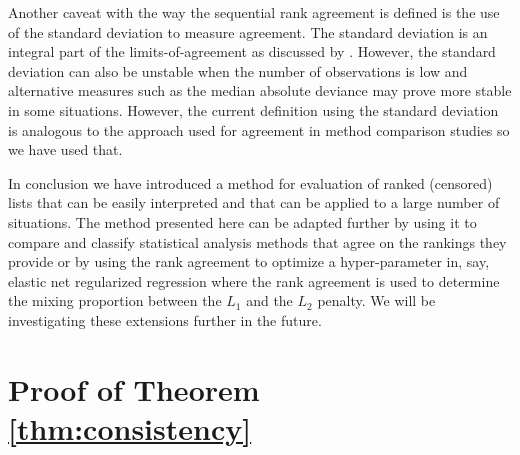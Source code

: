 \documentclass[12pt,a4paper]{article}
\theoremstyle{plain}
\begin{document}
Another caveat with the way the sequential rank agreement is defined
is the use of the standard deviation to measure agreement. The
standard deviation is an integral part of the limits-of-agreement as
discussed by \citet{alt:bland:1983}. However, the standard deviation
can also be unstable when the number of observations is low and
alternative measures such as the median absolute deviance may prove more
stable in some situations. However, the current definition using the
standard deviation is analogous to the approach used for agreement in
method comparison studies so we have used that.

In conclusion we have introduced a method for evaluation of ranked
(censored) lists that can be easily interpreted and that can be
applied to a large number of situations.  The method presented here
can be adapted further by using it to compare and classify statistical
analysis methods that agree on the rankings they provide or by using
the rank agreement to optimize a hyper-parameter in, say, elastic net
regularized regression where the rank agreement is used to determine
the mixing proportion between the $L_1$ and the $L_2$ penalty.
We will be investigating these extensions further in the future.


%
















\appendix

\newpage
\section{Proof of Theorem \ref{thm:consistency}}
\end{document}
